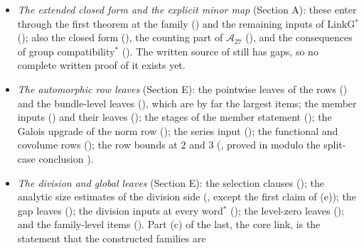 \documentclass[10pt]{amsart}
\theoremstyle{definition}
\theoremstyle{remark}
\begin{document}
\begin{itemize}
and the level character (\cite[Proposition~\ref{A-i3:prop-chi2}]{Annex}).
(\cite[Propositions~\ref{A-i3:S-prop-regions}, \ref{A-i3:S-prop-count}]{Annex}
are formally verified but not used for Theorem S.)
\item \emph{The extended closed form and the explicit minor map} (Section
A): these enter through the first theorem at the family
(\cite[Proposition~\ref{A-i1:prop-first}]{Annex}) and the remaining inputs
of $\mathrm{LinkG}$$^\ast$ (\cite[Proposition~\ref{A-i1:prop-linkG-res}]{Annex});
also the closed form (\cite[Proposition~\ref{A-i1:prop-closed}]{Annex}), the
counting part of $\mathcal A_{27}$
(\cite[Proposition~\ref{A-i1:prop-segdeg-rest}]{Annex}), and the
consequences of group compatibility$^\ast$
(\cite[Proposition~\ref{A-i1:prop-gc}]{Annex}). The written source of
\cite[Proposition~\ref{A-i1:prop-linkG-res}]{Annex} still has gaps, so no
complete written proof of it exists yet.
\item \emph{The automorphic row leaves} (Section E): the pointwise leaves
of the rows (\cite[Proposition~\ref{A-i4:A-prop-rowleaves}]{Annex}) and the
bundle-level leaves (\cite[Proposition~\ref{A-i4:A-prop-open}]{Annex}),
which are by far the largest items; the member inputs
(\cite[Proposition~\ref{A-i4:A-prop-inputs}(b)--(d)]{Annex}) and their
leaves (\cite[Proposition~\ref{A-i4:A-prop-inputs-leaves}]{Annex}); the
stages of the member statement
(\cite[Proposition~\ref{A-i4:A-prop-stages}]{Annex}); the Galois upgrade of
the norm row (\cite[Proposition~\ref{A-i4:A-prop-galois}]{Annex}); the
series input (\cite[Proposition~\ref{A-i4:A-prop-sern}]{Annex}); the
functional and covolume rows (\cite[Proposition~\ref{A-i4:A-prop-funcov}]{Annex});
the row bounds at $2$ and $3$ (\cite[Proposition~\ref{A-i4:A-prop-at23rows}]{Annex},
proved in \cite{Annex} modulo the split-case conclusion
\cite[Proposition~\ref{A-i4:A-prop-split}]{Annex}).
\item \emph{The division and global leaves} (Section E): the selection
clauses (\cite[Proposition~\ref{A-i4:Lprop-sel}(a)]{Annex}); the analytic
size estimates of the division side
(\cite[Proposition~\ref{A-i4:Lprop-D}]{Annex}, except the first claim of
(e)); the gap leaves (\cite[Proposition~\ref{A-i4:Lprop-gapleaves}]{Annex});
the division inputs at every word$^\ast$
(\cite[Proposition~\ref{A-i4:Lprop-pkg}]{Annex}); the level-zero leaves
(\cite[Proposition~\ref{A-i4:Lprop-forms}]{Annex}); and the family-level
items (\cite[Proposition~\ref{A-i4:Lprop-fam}]{Annex}). Part (c) of the last,
the core link, is the statement that the constructed families are
$$
\end{itemize}
\end{document}
